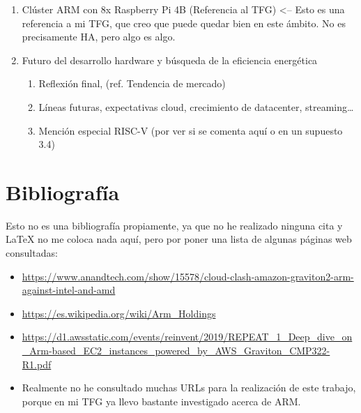 \documentclass[a4paper,openright,12pt]{article}
\begin{document}
\begin{enumerate}[1.]
\item Clúster ARM con 8x Raspberry Pi 4B (Referencia al TFG) <-- Esto es una referencia a mi TFG, que creo que puede quedar bien en este ámbito. No es precisamente HA, pero algo es algo.

\item Futuro del desarrollo hardware y búsqueda de la eficiencia energética
\begin{enumerate}[1.]
    \item Reflexión final, (ref. Tendencia de mercado)
    \item Líneas futuras, expectativas cloud, crecimiento de datacenter, streaming\ldots
    \item Mención especial RISC-V (por ver si se comenta aquí o en un supuesto 3.4)
\end{enumerate}
    
\end{enumerate}

\clearpage
\section{Bibliografía}
Esto no es una bibliografía propiamente, ya que no he realizado ninguna cita y \LaTeX{} no me coloca nada aquí, pero por poner una lista de algunas páginas web consultadas:
\begin{itemize}
    \item \url{https://www.anandtech.com/show/15578/cloud-clash-amazon-graviton2-arm-against-intel-and-amd}
    \item \url{https://es.wikipedia.org/wiki/Arm_Holdings}
    \item \url{https://d1.awsstatic.com/events/reinvent/2019/REPEAT_1_Deep_dive_on_Arm-based_EC2_instances_powered_by_AWS_Graviton_CMP322-R1.pdf}
    \item Realmente no he consultado muchas URLs para la realización de este trabajo, porque en mi TFG ya llevo bastante investigado acerca de ARM.
\end{itemize}
\end{document}
